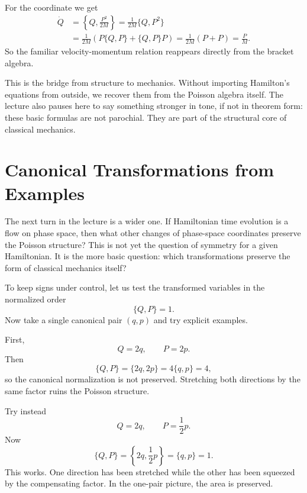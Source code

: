 For the coordinate we get
\begin{align}
\dot Q
&=\left\{Q,\frac{P^2}{2M}\right\}
=\frac{1}{2M}\{Q,P^2\} \\
&=\frac{1}{2M}\left(P\{Q,P\}+\{Q,P\}P\right)
=\frac{1}{2M}(P+P)
=\frac{P}{M}.
\end{align}
So the familiar velocity-momentum relation reappears directly from the bracket algebra.

This is the bridge from structure to mechanics. Without importing Hamilton's equations from outside, we recover them from the Poisson algebra itself. The lecture also pauses here to say something stronger in tone, if not in theorem form: these basic formulas are not parochial. They are part of the structural core of classical mechanics.

\section{Canonical Transformations from Examples}

The next turn in the lecture is a wider one. If Hamiltonian time evolution is a flow on phase space, then what other changes of phase-space coordinates preserve the Poisson structure? This is not yet the question of symmetry for a given Hamiltonian. It is the more basic question: which transformations preserve the form of classical mechanics itself?

To keep signs under control, let us test the transformed variables in the normalized order
\[
\{Q,P\}=1.
\]
Now take a single canonical pair \((q,p)\) and try explicit examples.

First,
\begin{equation}
Q=2q,\qquad P=2p.
\end{equation}
Then
\begin{equation}
\{Q,P\}=\{2q,2p\}=4\{q,p\}=4,
\end{equation}
so the canonical normalization is not preserved. Stretching both directions by the same factor ruins the Poisson structure.

Try instead
\begin{equation}
Q=2q,\qquad P=\frac12 p.
\end{equation}
Now
\begin{equation}
\{Q,P\}=\left\{2q,\frac12 p\right\}=\{q,p\}=1.
\end{equation}
This works. One direction has been stretched while the other has been squeezed by the compensating factor. In the one-pair picture, the area is preserved.

